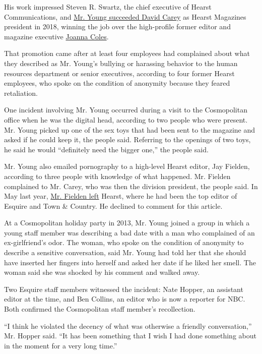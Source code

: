His work impressed Steven R. Swartz, the chief executive of Hearst
Communications, and
\href{https://www.nytimes3xbfgragh.onion/2018/07/25/business/hearst-magazines-president.html}{Mr.
Young succeeded David Carey} as Hearst Magazines president in 2018,
winning the job over the high-profile former editor and magazine
executive
\href{https://www.nytimes3xbfgragh.onion/2018/08/06/business/media/joanna-coles-troy-young-hearst.html}{Joanna
Coles}.

That promotion came after at least four employees had complained about
what they described as Mr. Young's bullying or harassing behavior to the
human resources department or senior executives, according to four
former Hearst employees, who spoke on the condition of anonymity because
they feared retaliation.

One incident involving Mr. Young occurred during a visit to the
Cosmopolitan office when he was the digital head, according to two
people who were present. Mr. Young picked up one of the sex toys that
had been sent to the magazine and asked if he could keep it, the people
said. Referring to the openings of two toys, he said he would
``definitely need the bigger one,'' the people said.

Mr. Young also emailed pornography to a high-level Hearst editor, Jay
Fielden, according to three people with knowledge of what happened. Mr.
Fielden complained to Mr. Carey, who was then the division president,
the people said. In May last year,
\href{https://www.nytimes3xbfgragh.onion/2019/05/23/business/media/esquires-editor-fielden-hearst-magazines.html}{Mr.
Fielden left} Hearst, where he had been the top editor of Esquire and
Town \& Country. He declined to comment for this article.

At a Cosmopolitan holiday party in 2013, Mr. Young joined a group in
which a young staff member was describing a bad date with a man who
complained of an ex-girlfriend's odor. The woman, who spoke on the
condition of anonymity to describe a sensitive conversation, said Mr.
Young had told her that she should have inserted her fingers into
herself and asked her date if he liked her smell. The woman said she was
shocked by his comment and walked away.

Two Esquire staff members witnessed the incident: Nate Hopper, an
assistant editor at the time, and Ben Collins, an editor who is now a
reporter for NBC. Both confirmed the Cosmopolitan staff member's
recollection.

``I think he violated the decency of what was otherwise a friendly
conversation,'' Mr. Hopper said. ``It has been something that I wish I
had done something about in the moment for a very long time.''

